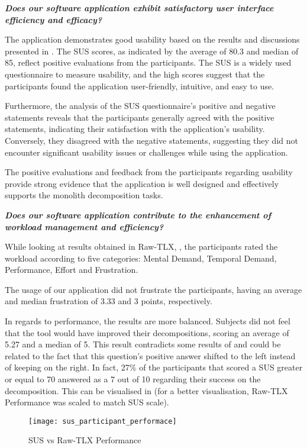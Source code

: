 \textbf{\emph{Does our software application exhibit satisfactory user interface
efficiency and efficacy?}}

The application demonstrates good usability based on the results and
discussions presented in . The SUS scores, as indicated by the
average of 80.3 and median of 85, reflect positive evaluations from the
participants. The SUS is a widely used questionnaire to measure usability, and
the high scores suggest that the participants found the application
user-friendly, intuitive, and easy to use.

Furthermore, the analysis of the SUS questionnaire's positive and negative
statements reveals that the participants generally agreed with the positive
statements, indicating their satisfaction with the application's usability.
Conversely, they disagreed with the negative statements, suggesting they did
not encounter significant usability issues or challenges while using the
application.

The positive evaluations and feedback from the participants regarding usability
provide strong evidence that the application is well designed and effectively
supports the monolith decomposition tasks.

\textbf{\emph{Does our software application contribute to the enhancement of
workload management and efficiency?}}

While looking at results obtained in Raw-TLX, , the
participants rated the workload according to five categories: Mental Demand,
Temporal Demand, Performance, Effort and Frustration.

The usage of our application did not frustrate the participants, having an
average and median frustration of 3.33 and 3 points, respectively.

In regards to performance, the results are more balanced. Subjects did not feel
that the tool would have improved their decompositions, scoring an average of
5.27 and a median of 5. This result contradicts some results of 
and could be related to the fact that this question's positive answer shifted
to the left instead of keeping on the right. In fact, 27\% of the
participants that scored a SUS greater or equal to 70 answered as a 7 out of 10
regarding their success on the decomposition. This can be visualised in
 (for a better visualisation, Raw-TLX
Performance was scaled to match SUS scale).

\begin{figure*}[!htb]
  \caption{SUS vs Raw-TLX Performance}
  \label{fig:sus_participant_performance}
  \centering
  \texttt{[image: sus\_participant\_performace]}
\end{figure*}

